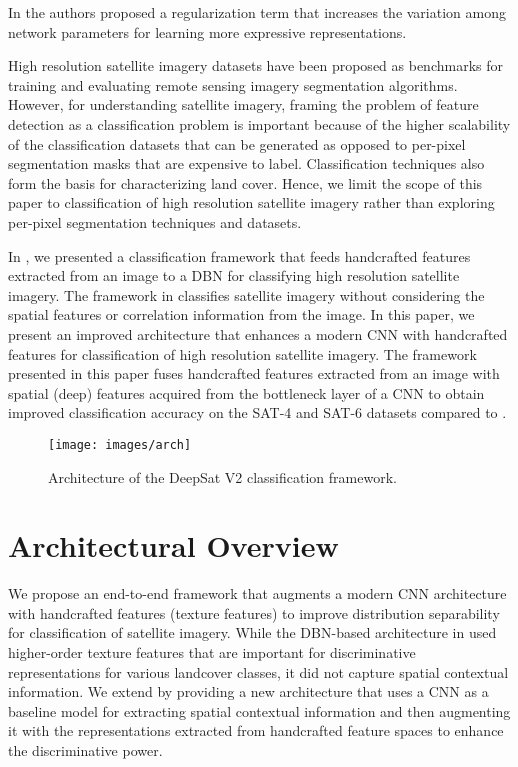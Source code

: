 \documentclass[]{interact}
\theoremstyle{plain}\newtheorem{theorem}{Theorem}[section]
\theoremstyle{definition}
\theoremstyle{remark}
\begin{document}
In \citep{gong2018diversity}  the authors proposed a regularization term that increases the variation among network parameters for learning more expressive representations.  



High resolution satellite imagery datasets \citep{van2018spacenet} have been proposed as benchmarks for training and evaluating remote sensing imagery segmentation algorithms. However, for understanding satellite imagery,  framing the problem of feature detection as a classification problem is  important  because of the higher scalability of the classification datasets that can be generated as opposed to per-pixel segmentation masks that are expensive to label.
Classification techniques also form the basis for characterizing land cover. Hence, we limit the scope of this paper to  classification of high resolution satellite imagery rather than exploring per-pixel segmentation techniques and datasets. 

In \citep{basu2015}, we presented a classification framework that feeds handcrafted features extracted from an image  to a DBN for classifying high resolution satellite imagery. The framework in \citep{basu2015} classifies satellite imagery without considering the spatial features or correlation information from the image. In this paper,  we present an improved architecture that enhances  a modern CNN  with handcrafted features for classification of high resolution satellite imagery. The framework presented in this paper fuses handcrafted features extracted from an image with spatial (deep) features acquired from the bottleneck layer of a  CNN to obtain improved classification accuracy on the SAT-4 and SAT-6 datasets compared to \citep{basu2015}.  

\begin{figure*}
  \centering
    \texttt{[image: images/arch]}
  \caption{Architecture of the DeepSat V2 classification framework.} \label{arch}
\end{figure*}


\section{Architectural Overview}
We propose an end-to-end framework   that augments a modern CNN architecture with handcrafted features (texture features)  to improve distribution separability for classification of satellite imagery. While the DBN-based architecture in \citep{basu2015} used   higher-order texture features  that are important  for discriminative representations  for various landcover classes, it did not capture spatial contextual information. We extend \citep{basu2015} by providing a new architecture that uses a  CNN as a  baseline model  for extracting spatial contextual information and  then augmenting it with  the representations extracted from handcrafted feature spaces to enhance the discriminative power.
\end{document}
